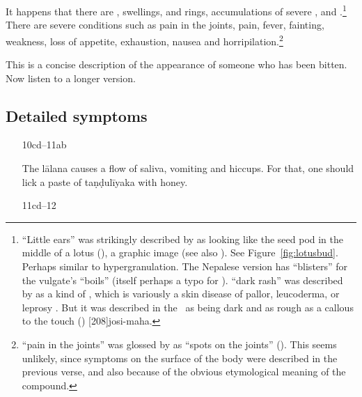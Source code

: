 \begin{translation}
It happens that there are , swellings,
 and rings, accumulations of
severe , 
and .\footnote{\label{karṇika}“Little ears” was strikingly described
    by  as looking like the seed pod in the middle of
    a lotus (), a graphic image (see also
    ).  See Figure~\ref{fig:lotusbud}.  Perhaps similar to 
    hypergranulation. 
    The Nepalese version has  “blisters” for the
    vulgate's  “boils” (itself perhaps a typo for
    ).   “dark rash” was described by
     as a kind of , which is
    variously a skin disease of pallor, leucoderma, or leprosy
    \citep{emme-1984}. But it was described in the \CS\ as being dark
    and as rough as a callous to the touch ()
    [208]{josi-maha}.}  There are severe conditions such
    as pain in the joints, pain, fever, fainting, weakness, loss of
    appetite, exhaustion, nausea and
    horripilation.\footnote{ “pain in the joints” was
        glossed by  as “spots on the joints”
        ().  This seems unlikely, since symptoms on
        the surface of the body were described in the previous verse, and
        also because of the obvious etymological meaning of the
        compound.}
        

This is a concise description of the appearance of someone who has been 
bitten.  Now listen to a longer version. 

\subsection{Detailed symptoms}

\begin{itemize}
\item[10cd--11ab]

The \Gls{lālana} causes a flow of saliva, vomiting and hiccups.  For that, one 
should lick a paste of \gls{taṇḍulīyaka} with honey. 

\item [11cd--12]


\end{itemize}
\end{translation}
